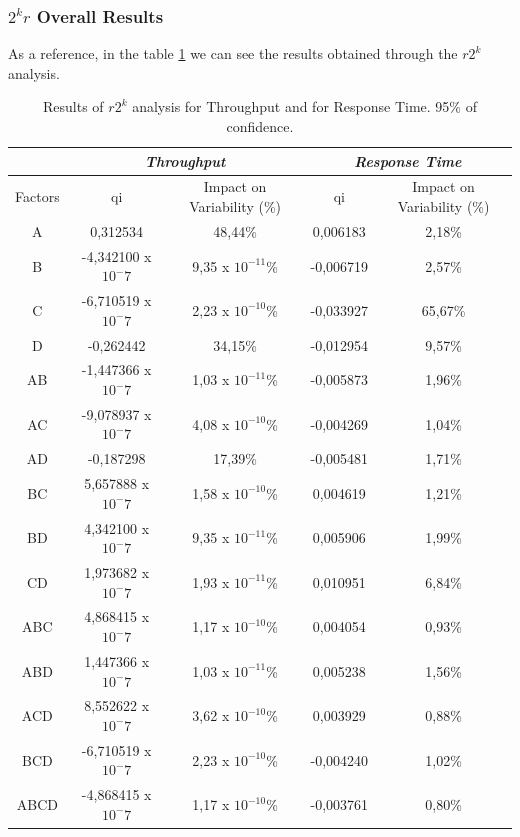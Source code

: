\subsubsection{$2^kr$ Overall Results}
As a reference, in the table \ref{tab: 2kr_results} we can see the results obtained through the $r2^k$ analysis.
\begin{table}[H]
	\centering
	\begin{tabular}{|c|c|c|c|c|}
		\hline
		\textbf{} & \multicolumn{2}{c|}{\textit{\textbf{Throughput}}} & \multicolumn{2}{c|}{\textit{\textbf{Response Time}}} \\ \hline
		Factors   & qi          & Impact on Variability (\%)          & qi            & Impact on Variability (\%)           \\ \hline
		A    & 0,312534      & 48,44\%    & 0,006183  & 2,18\%  \\ \hline
		B    & -4,342100 x $10^-7$ & 9,35 x $10^{-11}$\% & -0,006719 & 2,57\%  \\ \hline
		C    & -6,710519 x $10^-7$ & 2,23 x $10^{-10}$\% & -0,033927 & 65,67\% \\ \hline
		D    & -0,262442     & 34,15\%    & -0,012954 & 9,57\%  \\ \hline
		AB   & -1,447366 x $10^-7$ & 1,03 x $10^{-11}$\% & -0,005873 & 1,96\%  \\ \hline
		AC   & -9,078937 x $10^-7$ & 4,08 x $10^{-10}$\% & -0,004269 & 1,04\%  \\ \hline
		AD   & -0,187298     & 17,39\%    & -0,005481 & 1,71\%  \\ \hline
		BC   & 5,657888 x $10^-7$  & 1,58 x $10^{-10}$\% & 0,004619  & 1,21\%  \\ \hline
		BD   & 4,342100 x $10^-7$  & 9,35 x $10^{-11}$\% & 0,005906  & 1,99\%  \\ \hline
		CD   & 1,973682 x $10^-7$  & 1,93 x $10^{-11}$\% & 0,010951  & 6,84\%  \\ \hline
		ABC  & 4,868415 x $10^-7$  & 1,17 x $10^{-10}$\% & 0,004054  & 0,93\%  \\ \hline
		ABD  & 1,447366 x $10^-7$  & 1,03 x $10^{-11}$\% & 0,005238  & 1,56\%  \\ \hline
		ACD  & 8,552622 x $10^-7$  & 3,62 x $10^{-10}$\% & 0,003929  & 0,88\%  \\ \hline
		BCD  & -6,710519 x $10^-7$ & 2,23 x $10^{-10}$\% & -0,004240 & 1,02\%  \\ \hline
		ABCD & -4,868415 x $10^-7$ & 1,17 x $10^{-10}$\% & -0,003761 & 0,80\%  \\ \hline
	\end{tabular}
	\caption{Results of $r2^k$ analysis for Throughput and for Response Time. 95\% of confidence.}
	\label{tab: 2kr_results}
\end{table}
																
